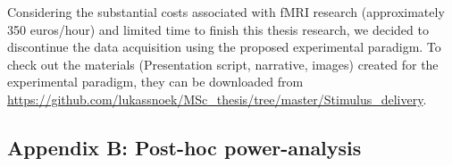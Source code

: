 \documentclass[jou,12pt,a4paper]{apa6}
\begin{document}
Considering the substantial costs associated with fMRI research (approximately 350 euros/hour) and limited time to finish this thesis research, we decided to discontinue the data acquisition using the proposed experimental paradigm. To check out the materials (Presentation script, narrative, images) created for the experimental paradigm, they can be downloaded from \url{https://github.com/lukassnoek/MSc_thesis/tree/master/Stimulus_delivery}.

\newpage
\vspace*{1px}
\subsection{\LARGE \textnormal{Appendix B: Post-hoc power-analysis}}
\vspace{10px}
\end{document}
